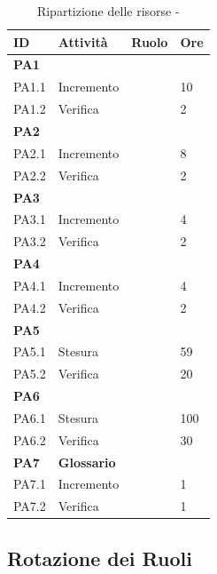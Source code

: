 \documentclass[12pt,a4paper]{article}
\begin{document}
\begin{table}[H]
	\begin{center}
		\begin{tabular}{p{} p{} p{} p{}}
			\toprule
			\textbf{ID}	& \textbf{Attività}	& \textbf{Ruolo} & \textbf{Ore}\\ \midrule
			\midrule
			\textbf{PA1} & \textbf{\AdR} & &  \\ \midrule
			PA1.1 & Incremento & \AN & 10 \\ \midrule
			PA1.2 & Verifica & \VR & 2 \\ \midrule
			\textbf{PA2} & \textbf{\NdP} &  &  \\ \midrule
			PA2.1 & Incremento & \AM & 8 \\ \midrule
			PA2.2 & Verifica & \VR & 2 \\ \midrule
			\textbf{PA3} & \textbf{\PdP} & &  \\ \midrule
			PA3.1 & Incremento & \RE & 4 \\ \midrule
			PA3.2 & Verifica & \VR & 2 \\ \midrule
			\textbf{PA4} & \textbf{\PdQ} & &  \\ \midrule
			PA4.1 & Incremento & \RE & 4 \\ \midrule
			PA4.2 & Verifica & \VR & 2 \\ \midrule
			\textbf{PA5} & \textbf{\ST} & &  \\ \midrule
			PA5.1 & Stesura & \PG & 59 \\ \midrule
			PA5.2 & Verifica & \VR & 20 \\ \midrule
			\textbf{PA6} & \textbf{\DP} & &  \\ \midrule
			PA6.1 & Stesura & \PG & 100 \\ \midrule
			PA6.2 & Verifica & \VR & 30 \\ \midrule
			\textbf{PA7} & \textbf{Glossario} & &  \\ \midrule
			PA7.1 & Incremento & \VR & 1 \\ \midrule
			PA7.2 & Verifica & \VR & 1 \\
			\bottomrule
		\end{tabular}
		\caption{Ripartizione delle risorse - \FPA}
	\end{center}
\end{table}

\subsection{Rotazione dei Ruoli}
\end{document}
